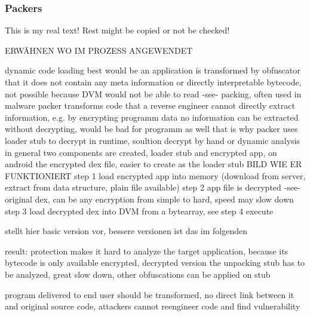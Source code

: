 \subsubsection{Packers}\label{subsubsection:counter-reengineering-propack-packers}
This is my real text! Rest might be copied or not be checked!

ERWÄHNEN WO IM PROZESS ANGEWENDET\newline

%
dynamic code loading
best would be an application is transformed by obfuscator that it does not contain any meta information or directly interpretable bytecode, not possible because DVM would not be able to read -see- packing, often used in malware \cite{packerProblemSolution}\newline
packer transforms code that a reverse engineer cannot directly extract information, e.g. by encrypting programm data no information can be extracted without decrypting, would be bad for programm as well that is why packer uses loader stub to decrypt in runtime, soultion decrypt by hand or dynamic analysis\newline
in general two components are created, loader stub and encrypted app, on android the encrypted dex file, easier to create as the loader stub\newline
BILD WIE ER FUNKTIONIERT
step 1 load encrypted app into memory (download from server, extract from data structure, plain file available)
step 2 app file is decrypted -see- original dex, can be any encryption from simple to hard, speed may slow down
step 3 load decrypted dex into DVM from a bytearray, see \cite{schulzLabCourse}
step 4 execute\newline

\cite{schulzLabCourse} stellt hier basic version vor, bessere versionen ist das im folgenden

result: protection makes it hard to analyze the target application, because its bytecode is only available encrypted, decrypted version the unpacking stub has to be analyzed, great slow down, other obfuscations can be applied on stub
%

%
program delivered to end user should be transformed, no direct link between it and original source code, attackers cannot reengineer code and find vulnerability

\cite{munteanLicense}


